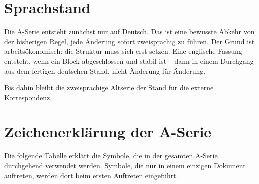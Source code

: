 \section{Sprachstand}

Die A-Serie entsteht zunächst nur auf Deutsch. Das ist eine bewusste Abkehr von
der bisherigen Regel, jede Änderung sofort zweisprachig zu führen. Der Grund
ist arbeitsökonomisch: die Struktur muss sich erst setzen. Eine englische
Fassung entsteht, wenn ein Block abgeschlossen und stabil ist -- dann in einem
Durchgang aus dem fertigen deutschen Stand, nicht Änderung für Änderung.

Bis dahin bleibt die zweisprachige Altserie der Stand für die externe
Korrespondenz.

\section{Zeichenerklärung der A-Serie}

Die folgende Tabelle erklärt die Symbole, die in der gesamten A-Serie durchgehend
verwendet werden. Symbole, die nur in einem einzigen Dokument auftreten, werden
dort beim ersten Auftreten eingeführt.

